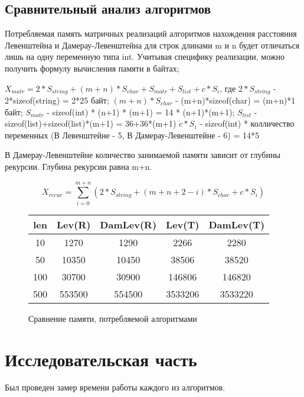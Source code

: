 \documentclass[12pt]{report}
\begin{document}
\section{Сравнительный анализ алгоритмов}
Потребляемая память матричных реализаций алгоритмов нахождения расстояния Левенштейна и Дамерау-Левенштейна для строк длинами m и n  будет отличаться лишь на одну переменную типа int. Учитывая специфику реализации, можно получить формулу вычисления памяти в байтах;

$X_{matr} = 2*S_{string}+(m+n)*S_{char}+S_{matr}+S_{list} + c*S_{i}$, где
\newline
$2*S_{string}$ - 2*sizeof(string) = 2*25 байт;
\newline
$(m+n)*S_{char}$ - (m+n)*sizeof(char) = (m+n)*1 байт;
\newline
$S_{matr}$ - sizeof(int) * (n+1) * (m+1) = 14 * (n+1)*(m+1);
\newline
$S_{list}$ - sizeof(list)+sizeof(list)*(m+1) = 36+36*(m+1)
\newline
$c*S_{i}$ - sizeof(int) * колличество переменных (В Левенштейне - 5, В Дамерау-Левенштейне - 6) = 14*5
\par \newline
В Дамерау-Левенштейне количество занимаемой памяти зависит от глубины рекурсии. Глубина рекурсии равна m+n.

$$X_{recur} = \sum_{i=0}^{m+n} (2*S_{string}+(m+n+2-i)*S_{char}+c*S_i)$$
\newline
\begin{figure}
\begin{center}
	\begin{tabular}{|c c c c c|} 
 	\hline
	len & Lev(R) & DamLev(R) & Lev(T) & DamLev(T) \\ [0.5ex] 
 	\hline\hline
 	10 & 1270 & 1290 & 2266 & 2280\\
 	\hline
 	50 & 10350 & 10450 & 38506 & 38520\\
 	\hline
	100 & 30700 & 30900 & 146806 & 146820\\
	\hline
	500 & 553500 & 554500 & 3533206 & 3533220\\
	\hline
	\end{tabular}
\end{center}
\caption{Сравнение памяти, потребляемой алгоритмами}
\end{figure}

\chapter{Исследовательская часть}
Был проведен замер времени работы каждого из алгоритмов.
\end{document}
